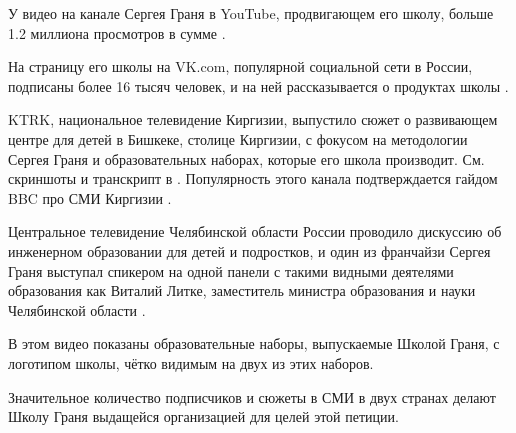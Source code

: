 
У видео на канале Сергея Граня в YouTube, продвигающем его школу,
больше 1.2 миллиона просмотров в сумме .

На страницу его школы на VK.com, популярной социальной сети в России,
подписаны более 16 тысяч человек, и на ней рассказывается о продуктах школы .

KTRK, национальное телевидение Киргизии, выпустило сюжет
о развивающем центре для детей в Бишкеке, столице Киргизии,
с фокусом на методологии Сергея Граня и образовательных наборах,
которые его школа производит.
См. скриншоты и транскрипт в .
Популярность этого канала подтверждается гайдом BBC про СМИ Киргизии
.

Центральное телевидение Челябинской области России
проводило дискуссию об инженерном образовании для детей и подростков,
и один из франчайзи Сергея Граня выступал спикером
на одной панели с такими видными деятелями образования
как Виталий Литке, заместитель министра образования и науки Челябинской области
.

В этом видео показаны образовательные наборы, выпускаемые Школой Граня,
с логотипом школы, чётко видимым на двух из этих наборов.

Значительное количество подписчиков и сюжеты в СМИ в двух странах
делают Школу Граня выдащейся организацией для целей этой петиции.
